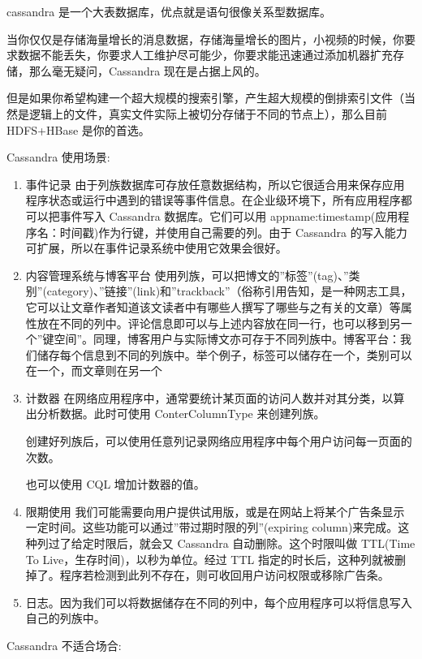 \documentclass[hyperref, UTF-8]{ctexart}
\begin{document}
cassandra 是一个大表数据库，优点就是语句很像关系型数据库。 

当你仅仅是存储海量增长的消息数据，存储海量增长的图片，小视频的时候，你要求数据不能丢失，你要求人工维护尽可能少，你要求能迅速通过添加机器扩充存储，那么毫无疑问，Cassandra 现在是占据上风的。  

但是如果你希望构建一个超大规模的搜索引擎，产生超大规模的倒排索引文件（当然是逻辑上的文件，真实文件实际上被切分存储于不同的节点上），那么目前 HDFS+HBase 是你的首选。

Cassandra 使用场景:

\begin{enumerate}
\item 事件记录
由于列族数据库可存放任意数据结构，所以它很适合用来保存应用程序状态或运行中遇到的错误等事件信息。在企业级环境下，所有应用程序都可以把事件写入 Cassandra 数据库。它们可以用 appname:timestamp(应用程序名：时间戳)作为行键，并使用自己需要的列。由于 Cassandra 的写入能力可扩展，所以在事件记录系统中使用它效果会很好。

\item 内容管理系统与博客平台
使用列族，可以把博文的”标签”(tag)、”类别”(category)、”链接”(link)和”trackback”（俗称引用告知，是一种网志工具，它可以让文章作者知道该文读者中有哪些人撰写了哪些与之有关的文章）等属性放在不同的列中。评论信息即可以与上述内容放在同一行，也可以移到另一个”键空间”。同理，博客用户与实际博文亦可存于不同列族中。博客平台：我们储存每个信息到不同的列族中。举个例子，标签可以储存在一个，类别可以在一个，而文章则在另一个
\item 计数器
在网络应用程序中，通常要统计某页面的访问人数并对其分类，以算出分析数据。此时可使用 ConterColumnType 来创建列族。

创建好列族后，可以使用任意列记录网络应用程序中每个用户访问每一页面的次数。

也可以使用 CQL 增加计数器的值。

\item 限期使用
我们可能需要向用户提供试用版，或是在网站上将某个广告条显示一定时间。这些功能可以通过”带过期时限的列”(expiring column)来完成。这种列过了给定时限后，就会又 Cassandra 自动删除。这个时限叫做 TTL(Time To Live，生存时间)，以秒为单位。经过 TTL 指定的时长后，这种列就被删掉了。程序若检测到此列不存在，则可收回用户访问权限或移除广告条。
\item 日志。因为我们可以将数据储存在不同的列中，每个应用程序可以将信息写入自己的列族中。
\end{enumerate}

Cassandra 不适合场合:
\end{document}
